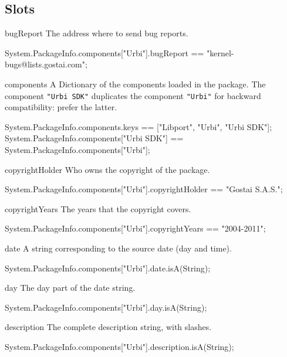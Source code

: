 \subsection{Slots}
\begin{urbiscriptapi}
\item[bugReport] The address where to send bug reports.
\begin{urbiassert}
System.PackageInfo.components["Urbi"].bugReport
  == "kernel-bugs@lists.gostai.com";
\end{urbiassert}


\item[components] A Dictionary of the components loaded in the package.  The
  component \lstinline|"Urbi SDK"| duplicates the component
  \lstinline|"Urbi"| for backward compatibility: prefer the latter.
\begin{urbiassert}
System.PackageInfo.components.keys
  == ["Libport", "Urbi", "Urbi SDK"];
System.PackageInfo.components["Urbi SDK"]
  == System.PackageInfo.components["Urbi"];
\end{urbiassert}


\item[copyrightHolder] Who owns the copyright of the package.
\begin{urbiassert}
System.PackageInfo.components["Urbi"].copyrightHolder
  == "Gostai S.A.S.";
\end{urbiassert}


\item[copyrightYears] The years that the copyright covers.
\begin{urbiassert}
System.PackageInfo.components["Urbi"].copyrightYears
  == "2004-2011";
\end{urbiassert}


\item[date] A string corresponding to the source date (day and time).
\begin{urbiassert}
System.PackageInfo.components["Urbi"].date.isA(String);
\end{urbiassert}


\item[day] The day part of the date string.
\begin{urbiassert}
System.PackageInfo.components["Urbi"].day.isA(String);
\end{urbiassert}


\item[description] The complete description string, with slashes.
\begin{urbiassert}
System.PackageInfo.components["Urbi"].description.isA(String);
\end{urbiassert}



\end{urbiscriptapi}
